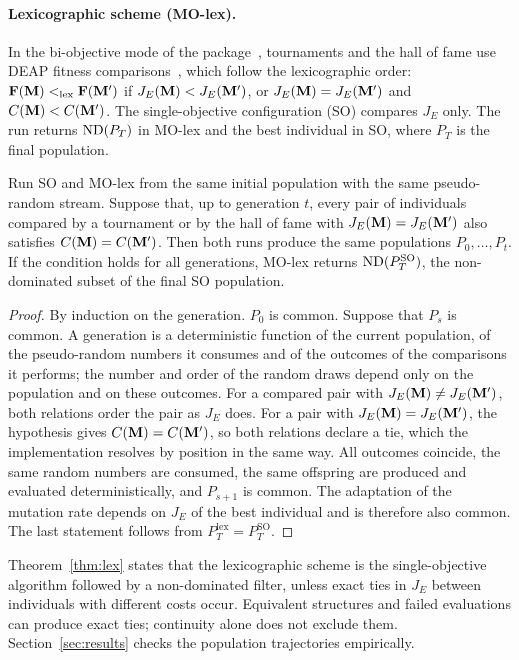 \paragraph{Lexicographic scheme (MO-lex).}
In the bi-objective mode of the package~\cite{mggpy}, tournaments and the hall of fame use DEAP fitness comparisons~\cite{FDG+2012,DEAPFitness}, which follow the
lexicographic order: $\mathbf{F}(\mathbf{M})<_{\mathrm{lex}}\mathbf{F}(\mathbf{M}')$ if $J_E(\mathbf{M})<J_E(\mathbf{M}')$, or $J_E(\mathbf{M})=J_E(\mathbf{M}')$ and $C(\mathbf{M})<C(\mathbf{M}')$.
The single-objective configuration (SO) compares $J_E$ only. The run returns $\operatorname{ND}(P_T)$ in MO-lex and the best
individual in SO, where $P_T$ is the final population.

\begin{theorem}\label{thm:lex}
Run SO and MO-lex from the same initial population with the same pseudo-random stream. Suppose that, up to generation
$t$, every pair of individuals compared by a tournament or by the hall of fame with $J_E(\mathbf{M})=J_E(\mathbf{M}')$ also satisfies
$C(\mathbf{M})=C(\mathbf{M}')$. Then both runs produce the same populations $P_0,\dots,P_t$. If the condition holds for all
generations, MO-lex returns $\operatorname{ND}(P_T^{\mathrm{SO}})$, the non-dominated subset of the final SO population.
\end{theorem}
\begin{proof}
By induction on the generation. $P_0$ is common. Suppose that $P_s$ is common. A generation is a deterministic
function of the current population, of the pseudo-random numbers it consumes and of the outcomes of the comparisons it
performs; the number and order of the random draws depend only on the population and on these outcomes. For a
compared pair with $J_E(\mathbf{M})\ne J_E(\mathbf{M}')$, both relations order the pair as $J_E$ does. For a pair with
$J_E(\mathbf{M})=J_E(\mathbf{M}')$, the hypothesis gives $C(\mathbf{M})=C(\mathbf{M}')$, so both relations declare a tie, which the implementation
resolves by position in the same way. All outcomes coincide, the same random numbers are consumed, the same offspring
are produced and evaluated deterministically, and $P_{s+1}$ is common. The adaptation of the mutation rate depends
on $J_E$ of the best individual and is therefore also common. The last statement follows from $P_T^{\mathrm{lex}}=P_T^{\mathrm{SO}}$.
\end{proof}

Theorem~\ref{thm:lex} states that the lexicographic scheme is the single-objective algorithm followed by a
non-dominated filter, unless exact ties in $J_E$ between individuals with different costs occur. Equivalent structures and failed evaluations can produce exact ties; continuity alone does not exclude them. Section~\ref{sec:results} checks the population trajectories empirically.

